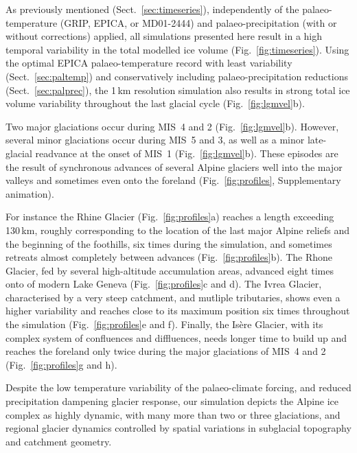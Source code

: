\documentclass[tc, manuscript]{copernicus}
\begin{document}
    As previously mentioned (Sect.~\ref{sec:timeseries}), independently of the
    palaeo-temperature (GRIP, EPICA, or MD01-2444) and palaeo-precipitation
    (with or without corrections) applied, all simulations presented here
    result in a high temporal variability in the total modelled ice volume
    (Fig.~\ref{fig:timeseries}). Using the optimal EPICA palaeo-temperature
    record with least variability (Sect.~\ref{sec:paltemp}) and conservatively
    including palaeo-precipitation reductions (Sect.~\ref{sec:palprec}), the
    1\,km resolution simulation also results in strong total ice volume
    variability throughout the last glacial cycle (Fig.~\ref{fig:lgmvel}b).

    Two major glaciations occur during MIS~4 and 2 (Fig.~\ref{fig:lgmvel}b).
    However, several minor glaciations occur during MIS~5 and 3, as well as a
    minor late-glacial readvance at the onset of MIS~1
    (Fig.~\ref{fig:lgmvel}b). These episodes are the result of synchronous
    advances of several Alpine glaciers well into the major valleys and sometimes
    even onto the foreland (Fig.~\ref{fig:profiles}, Supplementary animation).

    For instance the Rhine Glacier (Fig.~\ref{fig:profiles}a) reaches a length
    exceeding 130\,km, roughly corresponding to the location of the last major
    Alpine reliefs and the beginning of the foothills, six times during the
    simulation, and sometimes retreats almost completely between advances
    (Fig.~\ref{fig:profiles}b). The Rhone Glacier, fed by several high-altitude
    accumulation areas, advanced eight times onto of modern Lake
    Geneva (Fig.~\ref{fig:profiles}c and d). The Ivrea Glacier, characterised
    by a very steep catchment, and mutliple tributaries, shows even a higher
    variability and reaches close to its maximum position six times throughout
    the simulation (Fig.~\ref{fig:profiles}e and f). Finally, the Isère
    Glacier, with its complex system of confluences and diffluences, needs
    longer time to build up and reaches the foreland only twice during the
    major glaciations of MIS~4 and 2 (Fig.~\ref{fig:profiles}g and h).

    Despite the low temperature variability of the palaeo-climate forcing, and
    reduced precipitation dampening glacier response, our simulation depicts
    the Alpine ice complex as highly dynamic, with many more than two or three
    \citep[cf.][]{Preusser.2004,Ivy-Ochs.etal.2008} glaciations, and regional
    glacier dynamics controlled by spatial variations in subglacial topography
    and catchment geometry.
\end{document}
